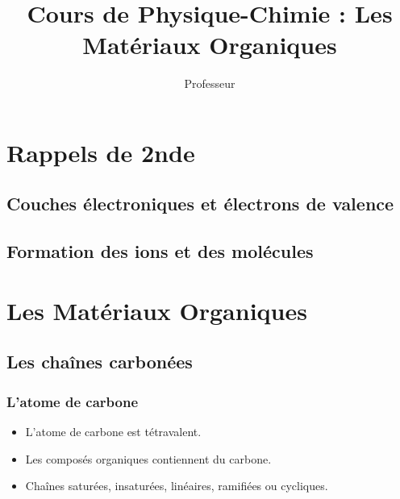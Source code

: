 \documentclass{article}
\title{Cours de Physique-Chimie : Les Matériaux Organiques}
\author{Professeur}
\date{}
\newif\ifWITHCORRECTION
\newcommand{\corrige}[2]{\ifWITHCORRECTION #1 \else \underline{\hspace{#2}} \fi}
\begin{document}
\maketitle

\section{Rappels de 2nde}
\subsection{Couches électroniques et électrons de valence}
\begin{tcolorbox}[colback=green!10!white, colframe=green!75!black, title=Définition : ]
  \corrige{Les couches électroniques sont des niveaux d'énergie dans lesquels se répartissent les électrons autour du noyau. Les électrons de valence sont les électrons situés sur la couche externe.}{6cm}
\end{tcolorbox}

\subsection{Formation des ions et des molécules}
\begin{tcolorbox}[colback=blue!10!white, colframe=blue!75!black, title=Application]
  \corrige{L'ion sodium Na$^+$ se forme en perdant un électron, tandis que l'ion chlorure Cl$^-$ se forme en en gagnant un. Ensemble, ils forment une molécule de chlorure de sodium (NaCl).}{7cm}
\end{tcolorbox}

\section{Les Matériaux Organiques}

\subsection{Les chaînes carbonées}
\subsubsection{L'atome de carbone}
\begin{itemize}[noitemsep]
    \item L'atome de carbone est tétravalent.
    \item Les composés organiques contiennent du carbone.
    \item Chaînes saturées, insaturées, linéaires, ramifiées ou cycliques.
\end{itemize}
\end{document}
